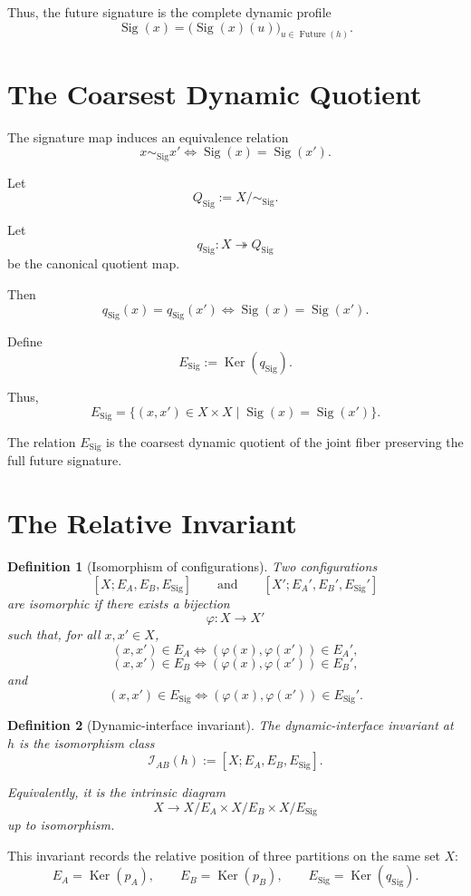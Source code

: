 \documentclass[11pt]{article}
\newcommand{\Future}{\operatorname{Future}}
\newcommand{\Sig}{\operatorname{Sig}}
\newcommand{\Ker}{\operatorname{Ker}}
\newtheorem{definition}{Definition}
\begin{document}
Thus, the future signature is the complete dynamic profile
\[
\Sig(x)=\bigl(\Sig(x)(u)\bigr)_{u\in\Future(h)}.
\]

\section{The Coarsest Dynamic Quotient}

The signature map induces an equivalence relation
\[
x\sim_\Sig x'
\iff
\Sig(x)=\Sig(x').
\]

Let
\[
Q_\Sig:=X/{\sim_\Sig}.
\]

Let
\[
q_\Sig:X\twoheadrightarrow Q_\Sig
\]
be the canonical quotient map.

Then
\[
q_\Sig(x)=q_\Sig(x')
\iff
\Sig(x)=\Sig(x').
\]

Define
\[
E_\Sig:=\Ker(q_\Sig).
\]

Thus,
\[
E_\Sig=\{(x,x')\in X\times X\mid \Sig(x)=\Sig(x')\}.
\]

The relation \(E_\Sig\) is the coarsest dynamic quotient of the joint fiber preserving the full future signature.

\section{The Relative Invariant}

\begin{definition}[Isomorphism of configurations]
Two configurations
\[
[X;E_A,E_B,E_\Sig]
\qquad\text{and}\qquad
[X';E_A',E_B',E_\Sig']
\]
are isomorphic if there exists a bijection
\[
\varphi:X\to X'
\]
such that, for all \(x,x'\in X\),
\[
(x,x')\in E_A
\iff
(\varphi(x),\varphi(x'))\in E_A',
\]
\[
(x,x')\in E_B
\iff
(\varphi(x),\varphi(x'))\in E_B',
\]
and
\[
(x,x')\in E_\Sig
\iff
(\varphi(x),\varphi(x'))\in E_\Sig'.
\]
\end{definition}

\begin{definition}[Dynamic-interface invariant]
The dynamic-interface invariant at \(h\) is the isomorphism class
\[
\boxed{
\mathcal I_{AB}(h):=[X;E_A,E_B,E_\Sig].
}
\]

Equivalently, it is the intrinsic diagram
\[
\boxed{
X\longrightarrow X/E_A\times X/E_B\times X/E_\Sig
}
\]
up to isomorphism.
\end{definition}

This invariant records the relative position of three partitions on the same set \(X\):
\[
E_A=\Ker(p_A),
\qquad
E_B=\Ker(p_B),
\qquad
E_\Sig=\Ker(q_\Sig).
\]
\end{document}
